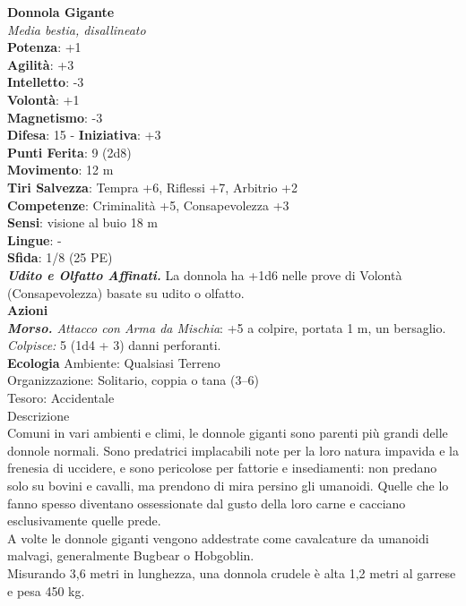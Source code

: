 \begin{multicols}{2}
\medskip\textbf{Donnola Gigante}\\
\emph{Media bestia, disallineato}\\
\textbf{Potenza}: +1\\
\textbf{Agilità}: +3\\
\textbf{Intelletto}: -3\\
\textbf{Volontà}: +1\\
\textbf{Magnetismo}: -3\\
\textbf{Difesa}: 15 - \textbf{Iniziativa}: +3\\
\textbf{Punti Ferita}: 9 (2d8)\\
\textbf{Movimento}: 12 m\\
\textbf{Tiri Salvezza}:  Tempra +6, Riflessi +7, Arbitrio +2 \\
\textbf{Competenze}: Criminalità +5, Consapevolezza +3\\
\textbf{Sensi}: visione al buio 18 m\\
\textbf{Lingue}: -\\
\textbf{Sfida}: 1/8 (25 PE)\smallskip\\
\emph{\textbf{Udito e Olfatto Affinati.}} La donnola ha +1d6 nelle prove di Volontà (Consapevolezza) basate su udito o olfatto.\\
\smallskip\textbf{Azioni}\\
\emph{\textbf{Morso.} Attacco con Arma da Mischia}: +5 a colpire, portata 1 m, un bersaglio.\\
\emph{Colpisce:} 5 (1d4 + 3) danni perforanti.\\
\textbf{Ecologia}
Ambiente: Qualsiasi Terreno\\
Organizzazione: Solitario, coppia o tana (3–6)\\
Tesoro: Accidentale\\
Descrizione\\

Comuni in vari ambienti e climi, le donnole giganti sono parenti più grandi delle donnole normali. Sono predatrici implacabili note per la loro natura impavida e la frenesia di uccidere, e sono pericolose per fattorie e insediamenti: non predano solo su bovini e cavalli, ma prendono di mira persino gli umanoidi. Quelle che lo fanno spesso diventano ossessionate dal gusto della loro carne e cacciano esclusivamente quelle prede.\\
A volte le donnole giganti vengono addestrate come cavalcature da umanoidi malvagi, generalmente Bugbear o Hobgoblin.\\
Misurando 3,6 metri in lunghezza, una donnola crudele è alta 1,2 metri al garrese e pesa 450 kg. \\


\end{multicols}
